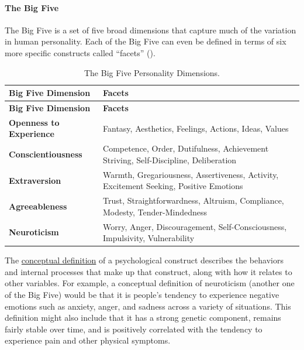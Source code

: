 \documentclass[
]{krantz}
\begin{document}
\paragraph*{The Big Five}\label{the-big-five}

The Big Five is a set of five broad dimensions that capture much of the variation in human personality. Each of the Big Five can even be defined in terms of six more specific constructs called ``facets'' ().

\begin{longtable}[]{@{}
  >{\raggedright\arraybackslash}p{}
  >{\raggedright\arraybackslash}p{}@{}}
\caption{\label{tab:big5} The Big Five Personality Dimensions.}\tabularnewline
\toprule\noalign{}
\begin{minipage}[b]{\linewidth}\raggedright
\textbf{Big Five Dimension}
\end{minipage} & \begin{minipage}[b]{\linewidth}\raggedright
\textbf{Facets}
\end{minipage} \\
\midrule\noalign{}
\endfirsthead
\toprule\noalign{}
\begin{minipage}[b]{\linewidth}\raggedright
\textbf{Big Five Dimension}
\end{minipage} & \begin{minipage}[b]{\linewidth}\raggedright
\textbf{Facets}
\end{minipage} \\
\midrule\noalign{}
\endhead
\bottomrule\noalign{}
\endlastfoot
\textbf{Openness to Experience} & Fantasy, Aesthetics, Feelings, Actions, Ideas, Values \\
\textbf{Conscientiousness} & Competence, Order, Dutifulness, Achievement Striving, Self-Discipline, Deliberation \\
\textbf{Extraversion} & Warmth, Gregariousness, Assertiveness, Activity, Excitement Seeking, Positive Emotions \\
\textbf{Agreeableness} & Trust, Straightforwardness, Altruism, Compliance, Modesty, Tender-Mindedness \\
\textbf{Neuroticism} & Worry, Anger, Discouragement, Self-Consciousness, Impulsivity, Vulnerability \\
\end{longtable}

The \hyperref[conceptual-definition]{conceptual definition} of a psychological construct describes the behaviors and internal processes that make up that construct, along with how it relates to other variables. For example, a conceptual definition of neuroticism (another one of the Big Five) would be that it is people's tendency to experience negative emotions such as anxiety, anger, and sadness across a variety of situations. This definition might also include that it has a strong genetic component, remains fairly stable over time, and is positively correlated with the tendency to experience pain and other physical symptoms.
\end{document}
